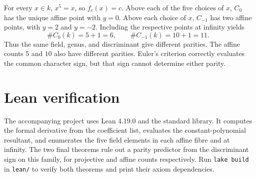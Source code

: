 \documentclass[11pt]{article}
\begin{document}
For every \(x\in k\), \(x^5=x\), so \(f_c(x)=c\). Above each of the
five choices of \(x\), \(C_0\) has the unique affine point with \(y=0\).
Above each choice of \(x\), \(C_{-1}\) has two affine points, with
\(y=2\) and \(y=-2\). Including the respective points at infinity yields
\[
  \#C_0(k)=5+1=6,\qquad \#C_{-1}(k)=10+1=11.
\]
Thus the same field, genus, and discriminant give different parities.
The affine counts \(5\) and \(10\) also have different parities. Euler's
criterion correctly evaluates the common character sign, but that sign
cannot determine either parity.

\section*{Lean verification}

The accompanying project uses Lean 4.19.0 and the standard library.
It computes the formal derivative from the coefficient list, evaluates the
constant-polynomial resultant, and enumerates the five field elements in
each affine fibre and at infinity. The two final theorems rule out a
parity predictor from the discriminant sign on this family, for projective
and affine counts respectively. Run \verb|lake build| in \verb|lean/| to
verify both theorems and print their axiom dependencies.
\end{document}
